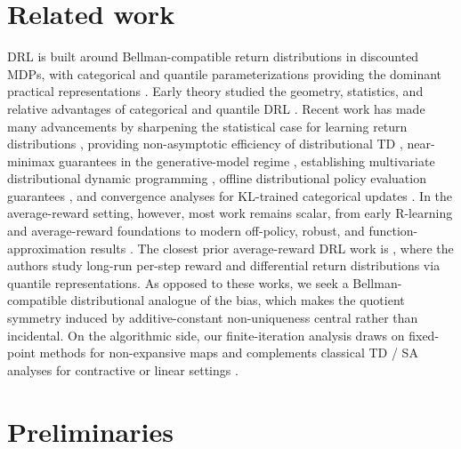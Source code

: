 \documentclass{article}
\begin{document}
\section{Related work}
DRL is built around Bellman-compatible return distributions in discounted MDPs, with categorical and quantile parameterizations providing the dominant practical representations \citep{bellemare2017distributional, rowland2018analysis, dabney2018distributional, dabney2018implicit}. Early theory studied the geometry, statistics, and relative advantages of categorical and quantile DRL \citep{rowland2018analysis, lyle2019comparative, rowland2019statistics}. Recent work has made many advancements by sharpening the statistical case for learning return distributions \citep{wang2023benefits, wang2024more}, providing non-asymptotic efficiency of distributional TD \citep{peng2024statistical, peng2025finite}, near-minimax guarantees in the generative-model regime \citep{rowland2024near}, establishing multivariate distributional dynamic programming \citep{wiltzer2024foundations}, offline distributional policy evaluation guarantees \citep{wu2023distributional}, and convergence analyses for KL-trained categorical updates \citep{kastner2025categorical}. In the average-reward setting, however, most work remains scalar, from early R-learning and average-reward foundations to modern off-policy, robust, and function-approximation results \citep{schwartz1993reinforcement,abounadi2001learning,mahadevan1996average, wan2021learning, wang2023model, vakili2024kernel, zurek2024span}. The closest prior average-reward DRL work is \citep{rojas2026differential}, where the authors study long-run per-step reward and differential return distributions via quantile representations. As opposed to these works, we seek a Bellman-compatible distributional analogue of the bias, which makes the quotient symmetry induced by additive-constant non-uniqueness central rather than incidental. On the algorithmic side, our finite-iteration analysis draws on fixed-point methods for non-expansive maps \citep{krasnosel1955two, mann1953mean, kim2007robustness,bravo2019rates,bravo2024stochastic,blaser2026asymptotic} and complements classical TD / SA analyses for contractive or linear settings \citep{dayan1994td,tsitsiklis1996analysis,bhandari2018finite,dalal2018finite,srikant2019finite,patil2023finite,qu2020finite,de2020fixed,chen2020finite,chen2022finite,chen2024lyapunov}.
\section{Preliminaries}\label{sec:prelim}
\end{document}
